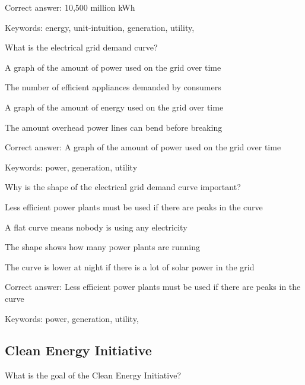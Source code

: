 Correct answer: 10,500 million kWh

Keywords: energy, unit-intuition, generation, utility, \Hawaii

\begin{question}
	\item What is the electrical grid demand curve?
\end{question}

\begin{answer}
	\item A graph of the amount of power used on the grid over time
	\item The number of efficient appliances demanded by consumers
	\item A graph of the amount of energy used on the grid over time
	\item The amount overhead power lines can bend before breaking
\end{answer}

Correct answer: A graph of the amount of power used on the grid over time

Keywords: power, generation, utility

\begin{question}
	\item Why is the shape of the electrical grid demand curve important?
\end{question}

\begin{answer}
	\item Less efficient power plants must be used if there are peaks in the curve 
	\item A flat curve means nobody is using any electricity
	\item The shape shows how many power plants are running
	\item The curve is lower at night if there is a lot of solar power in the grid
\end{answer}

Correct answer: Less efficient power plants must be used if there are peaks in the curve

Keywords: power, generation, utility, \Hawaii

\subsection{\Hawaii Clean Energy Initiative}

\begin{question}
	\item What is the goal of the \Hawaii Clean Energy Initiative?
\end{question}

